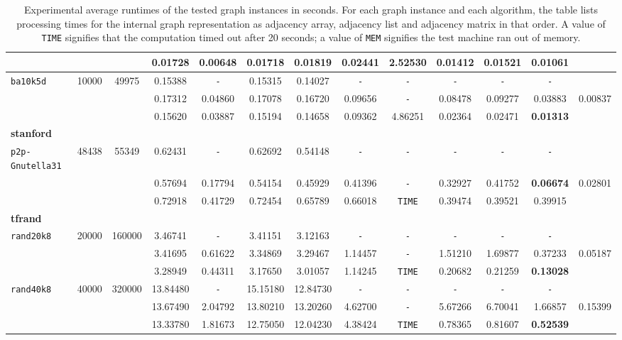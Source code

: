 \begin{table}
{\begin{tabular}{ l c c | c c c c c c c c c || c }
 &  &  & 0.01728 & \textbf{0.00648} & 0.01718 & 0.01819 & 0.02441 & 2.52530 & 0.01412 & 0.01521 & 0.01061 & \\
\hline
\verb|ba10k5d| & 10000 & 49975 & 0.15388 & \verb|-| & 0.15315 & 0.14027 & \verb|-| & \verb|-| & \verb|-| & \verb|-| & \verb|-| & \\
 &  &  & 0.17312 & 0.04860 & 0.17078 & 0.16720 & 0.09656 & \verb|-| & 0.08478 & 0.09277 & 0.03883 & 0.00837 \\
 &  &  & 0.15620 & 0.03887 & 0.15194 & 0.14658 & 0.09362 & 4.86251 & 0.02364 & 0.02471 & \textbf{0.01313} & \\
\hline
\multicolumn{13}{l}{\textbf{stanford}} \\
\hline
\verb|p2p-Gnutella31| & 48438 & 55349 & 0.62431 & \verb|-| & 0.62692 & 0.54148 & \verb|-| & \verb|-| & \verb|-| & \verb|-| & \verb|-| & \\
 &  &  & 0.57694 & 0.17794 & 0.54154 & 0.45929 & 0.41396 & \verb|-| & 0.32927 & 0.41752 & \textbf{0.06674} & 0.02801 \\
 &  &  & 0.72918 & 0.41729 & 0.72454 & 0.65789 & 0.66018 & \verb|TIME| & 0.39474 & 0.39521 & 0.39915 & \\
\hline
\multicolumn{13}{l}{\textbf{tfrand}} \\
\hline
\verb|rand20k8| & 20000 & 160000 & 3.46741 & \verb|-| & 3.41151 & 3.12163 & \verb|-| & \verb|-| & \verb|-| & \verb|-| & \verb|-| & \\
 &  &  & 3.41695 & 0.61622 & 3.34869 & 3.29467 & 1.14457 & \verb|-| & 1.51210 & 1.69877 & 0.37233 & 0.05187 \\
 &  &  & 3.28949 & 0.44311 & 3.17650 & 3.01057 & 1.14245 & \verb|TIME| & 0.20682 & 0.21259 & \textbf{0.13028} & \\
\hline
\verb|rand40k8| & 40000 & 320000 & 13.84480 & \verb|-| & 15.15180 & 12.84730 & \verb|-| & \verb|-| & \verb|-| & \verb|-| & \verb|-| & \\
 &  &  & 13.67490 & 2.04792 & 13.80210 & 13.20260 & 4.62700 & \verb|-| & 5.67266 & 6.70041 & 1.66857 & 0.15399 \\
 &  &  & 13.33780 & 1.81673 & 12.75050 & 12.04230 & 4.38424 & \verb|TIME| & 0.78365 & 0.81607 & \textbf{0.52539} & \\
\hline
  \end{tabular}
}
\caption{Experimental average runtimes of the tested graph instances in seconds. For each graph instance and each algorithm, the table lists processing times for the internal graph representation as adjacency array, adjacency list and adjacency matrix in that order. A value of \texttt{TIME} signifies that the computation timed out after 20 seconds; a value of \texttt{MEM} signifies the test machine ran out of memory.}
\label{results}
\end{table}

